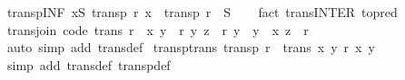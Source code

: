 \begin{isabellebody}
%
\isadelimproof
\isanewline
%
\endisadelimproof
\isanewline
{}\isamarkupfalse%
\ transp{\isacharunderscore}{\kern0pt}INF{\isacharcolon}{\kern0pt}\ {\isachardoublequoteopen}{\isasymforall}x{\isasymin}S{\isachardot}{\kern0pt}\ transp\ {\isacharparenleft}{\kern0pt}r\ x{\isacharparenright}{\kern0pt}\ {\isasymLongrightarrow}\ transp\ {\isacharparenleft}{\kern0pt}{\isasymSqinter}{\isacharparenleft}{\kern0pt}r\ {\isacharbackquote}{\kern0pt}\ S{\isacharparenright}{\kern0pt}{\isacharparenright}{\kern0pt}{\isachardoublequoteclose}\isanewline
%
\isadelimproof
\ \ %
\endisadelimproof
%
\isatagproof
{}\isamarkupfalse%
\ {\isacharparenleft}{\kern0pt}fact\ trans{\isacharunderscore}{\kern0pt}INTER\ {\isacharbrackleft}{\kern0pt}to{\isacharunderscore}{\kern0pt}pred{\isacharbrackright}{\kern0pt}{\isacharparenright}{\kern0pt}%
\endisatagproof
{\isafoldproof}%
%
\isadelimproof
\isanewline
%
\endisadelimproof
\ \ \ \ \isanewline
{}\isamarkupfalse%
\ trans{\isacharunderscore}{\kern0pt}join\ {\isacharbrackleft}{\kern0pt}code{\isacharbrackright}{\kern0pt}{\isacharcolon}{\kern0pt}\ {\isachardoublequoteopen}trans\ r\ {\isasymlongleftrightarrow}\ {\isacharparenleft}{\kern0pt}{\isasymforall}{\isacharparenleft}{\kern0pt}x{\isacharcomma}{\kern0pt}\ y{}{\isacharparenright}{\kern0pt}\ {\isasymin}\ r{\isachardot}{\kern0pt}\ {\isasymforall}{\isacharparenleft}{\kern0pt}y{}{\isacharcomma}{\kern0pt}\ z{\isacharparenright}{\kern0pt}\ {\isasymin}\ r{\isachardot}{\kern0pt}\ y{}\ {\isacharequal}{\kern0pt}\ y{}\ {\isasymlongrightarrow}\ {\isacharparenleft}{\kern0pt}x{\isacharcomma}{\kern0pt}\ z{\isacharparenright}{\kern0pt}\ {\isasymin}\ r{\isacharparenright}{\kern0pt}{\isachardoublequoteclose}\isanewline
%
\isadelimproof
\ \ %
\endisadelimproof
%
\isatagproof
{}\isamarkupfalse%
\ {\isacharparenleft}{\kern0pt}auto\ simp\ add{\isacharcolon}{\kern0pt}\ trans{\isacharunderscore}{\kern0pt}def{\isacharparenright}{\kern0pt}%
\endisatagproof
{\isafoldproof}%
%
\isadelimproof
\isanewline
%
\endisadelimproof
\isanewline
{}\isamarkupfalse%
\ transp{\isacharunderscore}{\kern0pt}trans{\isacharcolon}{\kern0pt}\ {\isachardoublequoteopen}transp\ r\ {\isasymlongleftrightarrow}\ trans\ {\isacharbraceleft}{\kern0pt}{\isacharparenleft}{\kern0pt}x{\isacharcomma}{\kern0pt}\ y{\isacharparenright}{\kern0pt}{\isachardot}{\kern0pt}\ r\ x\ y{\isacharbraceright}{\kern0pt}{\isachardoublequoteclose}\isanewline
%
\isadelimproof
\ \ %
\endisadelimproof
%
\isatagproof
{}\isamarkupfalse%
\ {\isacharparenleft}{\kern0pt}simp\ add{\isacharcolon}{\kern0pt}\ trans{\isacharunderscore}{\kern0pt}def\ transp{\isacharunderscore}{\kern0pt}def{\isacharparenright}{\kern0pt}%

\end{isabellebody}
